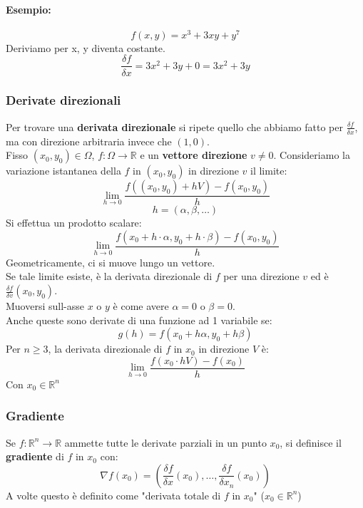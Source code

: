 \documentclass[12pt,a4paper]{article}
\begin{document}
\paragraph{Esempio:}
\[
f(x,y) = x^3 + 3xy + y^7
\]
Deriviamo per x, y diventa costante.
\[
\frac{\delta f}{\delta x} = 3x^2 + 3y + 0 = 3x^2 + 3y
\]
\subsubsection{Derivate direzionali}
Per trovare una \textbf{derivata direzionale} si ripete quello che abbiamo fatto per $\frac{\delta f}{\delta x}$, ma con direzione arbitraria invece che $(1,0)$.\\
Fisso $(x_0,y_0) \in \Omega$, $f:\Omega \to \mathbb{R}$ e un \textbf{vettore direzione} $v \ne 0$. Consideriamo la variazione istantanea della $f$ in $(x_0,y_0)$ in direzione $v$ il limite:
\[
\lim_{h \to 0} \frac{f((x_0, y_0) + hV) - f(x_0,y_0)}{h}
\]
\[
h = (\alpha,\beta,\ldots)
\]
Si effettua un prodotto scalare:
\[
\lim_{h \to 0} \frac{f(x_0 + h \cdot \alpha, y_0 + h \cdot \beta) - f(x_0,y_0)}{h}
\]
Geometricamente, ci si muove lungo un vettore.\\
Se tale limite esiste, è la derivata direzionale di $f$ per una direzione $v$ ed è $\frac{\delta f}{\delta v}(x_0,y_0)$.\\
Muoversi sull-asse $x$ o $y$ è come avere $\alpha = 0$ o $\beta = 0$.\\
Anche queste sono derivate di una funzione ad 1 variabile se:
\[
g(h) = f(x_0 + h\alpha, y_0 + h\beta)
\]
Per $n \geq 3$, la derivata direzionale di $f$ in $x_0$ in direzione $V$ è:
\[
\lim_{h \to 0} \frac{f(x_0 \cdot hV) - f(x_0)}{h}
\]
Con $x_0 \in \mathbb{R}^n$
\subsubsection{Gradiente}
Se $f:\mathbb{R}^n \to \mathbb{R}$ ammette tutte le derivate parziali in un punto $x_0$, si definisce il \textbf{gradiente} di $f$ in $x_0$ con:
\[
\nabla f(x_0) = (\frac{\delta f}{\delta x} (x_0),\ldots,\frac{\delta f}{\delta x_n} (x_0))
\]
A volte questo è definito come "derivata totale di $f$ in $x_0$" ($x_0 \in \mathbb{R}^n$)
\end{document}

